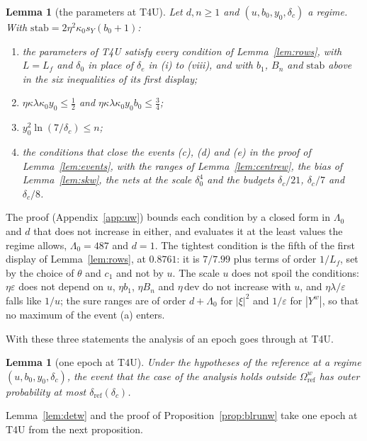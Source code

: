 \documentclass[11pt]{amsart}
\newtheorem{lemma}[theorem]{Lemma}
\theoremstyle{definition}
\numberwithin{equation}{section}
\begin{document}
\begin{lemma}[the parameters at T4U]\label{lem:rowsw}
Let $d,n\ge1$ and $(u,b_0,y_0,\delta_c)$ a regime. With $\mathrm{stab}=2\eta^2\kappa_0s_Y(b_0+1)$:
\begin{enumerate}[label=(\roman*)]
\item the parameters of T4U satisfy every condition of Lemma~\ref{lem:rows}, with $L=L_f$ and $\delta_0$ in place of $\delta_e$ in (i) to (viii), and with $b_1$, $B_n$ and $\mathrm{stab}$ above in the six inequalities of its first display;
\item $\eta\kappa\lambda\kappa_0y_0\le\frac12$ and $\eta\kappa\lambda\kappa_0y_0b_0\le\frac34$;
\item $y_0^2\ln(7/\delta_c)\le n$;
\item the conditions that close the events (c), (d) and (e) in the proof of Lemma~\ref{lem:events}, with the ranges of Lemma~\ref{lem:centrew}, the bias of Lemma~\ref{lem:skw}, the nets at the scale $\delta_0^4$ and the budgets $\delta_c/21$, $\delta_c/7$ and $\delta_c/8$.
\end{enumerate}
\end{lemma}

The proof (Appendix~\ref{app:uw}) bounds each condition by a closed form in $\Lambda_0$ and $d$ that does not increase in either, and evaluates it at the least values the regime allows, $\Lambda_0=487$ and $d=1$. The tightest condition is the fifth of the first display of Lemma~\ref{lem:rows}, at $0.8761$: it is $7/7.99$ plus terms of order $1/L_f$, set by the choice of $\theta$ and $c_1$ and not by $u$. The scale $u$ does not spoil the conditions: $\eta\varepsilon$ does not depend on $u$, $\eta b_1$, $\eta B_n$ and $\eta\,\mathrm{dev}$ do not increase with $u$, and $\eta\lambda/\varepsilon$ falls like $1/u$; the sure ranges are of order $d+\Lambda_0$ for $|\xi|^2$ and $1/\varepsilon$ for $|Y^w|$, so that no maximum of the event (a) enters.

With these three statements the analysis of an epoch goes through at T4U.

\begin{lemma}[one epoch at T4U]\label{lem:vew}
Under the hypotheses of the reference at a regime $(u,b_0,y_0,\delta_c)$, the event that the case of the analysis holds outside $\Omega^w_{\mathrm{ref}}$ has outer probability at most $\delta_{\mathrm{ref}}(\delta_c)$.
\end{lemma}
Lemma~\ref{lem:detw} and the proof of Proposition~\ref{prop:blrunw} take one epoch at T4U from the next proposition.
\end{document}
